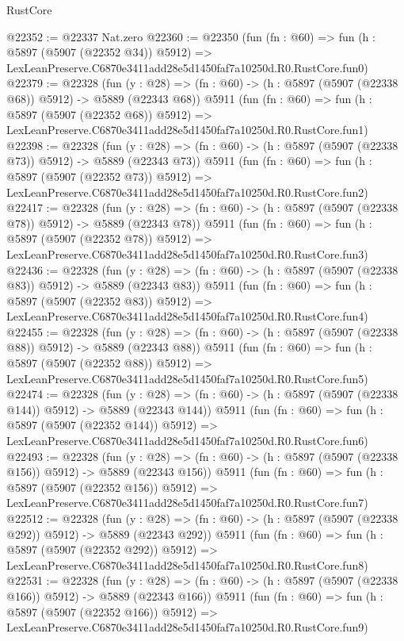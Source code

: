 \begin{lexlean}{RustCore}
\begin{coremodule}
@22352 := @22337 Nat.zero
@22360 := @22350
    (fun (fn : @60) =>
    fun (h : @5897 (@5907 (@22352 @34)) @5912) =>
    LexLeanPreserve.C6870e3411add28e5d1450faf7a10250d.R0.RustCore.fun0)
@22379 := @22328
    (fun (y : @28) => (fn : @60) -> (h : @5897 (@5907 (@22338 @68)) @5912) -> @5889 (@22343 @68))
    @5911
    (fun (fn : @60) =>
    fun (h : @5897 (@5907 (@22352 @68)) @5912) =>
    LexLeanPreserve.C6870e3411add28e5d1450faf7a10250d.R0.RustCore.fun1)
@22398 := @22328
    (fun (y : @28) => (fn : @60) -> (h : @5897 (@5907 (@22338 @73)) @5912) -> @5889 (@22343 @73))
    @5911
    (fun (fn : @60) =>
    fun (h : @5897 (@5907 (@22352 @73)) @5912) =>
    LexLeanPreserve.C6870e3411add28e5d1450faf7a10250d.R0.RustCore.fun2)
@22417 := @22328
    (fun (y : @28) => (fn : @60) -> (h : @5897 (@5907 (@22338 @78)) @5912) -> @5889 (@22343 @78))
    @5911
    (fun (fn : @60) =>
    fun (h : @5897 (@5907 (@22352 @78)) @5912) =>
    LexLeanPreserve.C6870e3411add28e5d1450faf7a10250d.R0.RustCore.fun3)
@22436 := @22328
    (fun (y : @28) => (fn : @60) -> (h : @5897 (@5907 (@22338 @83)) @5912) -> @5889 (@22343 @83))
    @5911
    (fun (fn : @60) =>
    fun (h : @5897 (@5907 (@22352 @83)) @5912) =>
    LexLeanPreserve.C6870e3411add28e5d1450faf7a10250d.R0.RustCore.fun4)
@22455 := @22328
    (fun (y : @28) => (fn : @60) -> (h : @5897 (@5907 (@22338 @88)) @5912) -> @5889 (@22343 @88))
    @5911
    (fun (fn : @60) =>
    fun (h : @5897 (@5907 (@22352 @88)) @5912) =>
    LexLeanPreserve.C6870e3411add28e5d1450faf7a10250d.R0.RustCore.fun5)
@22474 := @22328
    (fun (y : @28) => (fn : @60) -> (h : @5897 (@5907 (@22338 @144)) @5912) -> @5889 (@22343 @144))
    @5911
    (fun (fn : @60) =>
    fun (h : @5897 (@5907 (@22352 @144)) @5912) =>
    LexLeanPreserve.C6870e3411add28e5d1450faf7a10250d.R0.RustCore.fun6)
@22493 := @22328
    (fun (y : @28) => (fn : @60) -> (h : @5897 (@5907 (@22338 @156)) @5912) -> @5889 (@22343 @156))
    @5911
    (fun (fn : @60) =>
    fun (h : @5897 (@5907 (@22352 @156)) @5912) =>
    LexLeanPreserve.C6870e3411add28e5d1450faf7a10250d.R0.RustCore.fun7)
@22512 := @22328
    (fun (y : @28) => (fn : @60) -> (h : @5897 (@5907 (@22338 @292)) @5912) -> @5889 (@22343 @292))
    @5911
    (fun (fn : @60) =>
    fun (h : @5897 (@5907 (@22352 @292)) @5912) =>
    LexLeanPreserve.C6870e3411add28e5d1450faf7a10250d.R0.RustCore.fun8)
@22531 := @22328
    (fun (y : @28) => (fn : @60) -> (h : @5897 (@5907 (@22338 @166)) @5912) -> @5889 (@22343 @166))
    @5911
    (fun (fn : @60) =>
    fun (h : @5897 (@5907 (@22352 @166)) @5912) =>
    LexLeanPreserve.C6870e3411add28e5d1450faf7a10250d.R0.RustCore.fun9)

\end{coremodule}
\end{lexlean}
